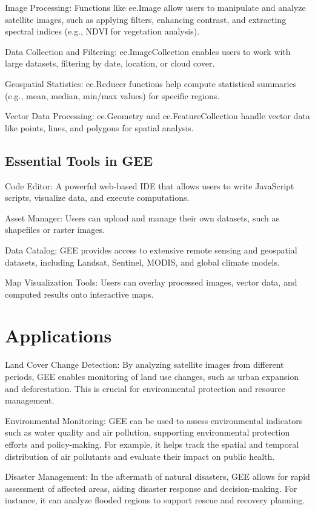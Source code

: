 \documentclass[
  letterpaper,
]{scrbook}
\begin{document}
Image Processing: Functions like ee.Image allow users to manipulate and
analyze satellite images, such as applying filters, enhancing contrast,
and extracting spectral indices (e.g., NDVI for vegetation analysis).

Data Collection and Filtering: ee.ImageCollection enables users to work
with large datasets, filtering by date, location, or cloud cover.

Geospatial Statistics: ee.Reducer functions help compute statistical
summaries (e.g., mean, median, min/max values) for specific regions.

Vector Data Processing: ee.Geometry and ee.FeatureCollection handle
vector data like points, lines, and polygons for spatial analysis.

\subsection{Essential Tools in GEE}\label{essential-tools-in-gee}

Code Editor: A powerful web-based IDE that allows users to write
JavaScript scripts, visualize data, and execute computations.

Asset Manager: Users can upload and manage their own datasets, such as
shapefiles or raster images.

Data Catalog: GEE provides access to extensive remote sensing and
geospatial datasets, including Landsat, Sentinel, MODIS, and global
climate models.

Map Visualization Tools: Users can overlay processed images, vector
data, and computed results onto interactive maps.

\section{Applications}\label{applications-3}

Land Cover Change Detection: By analyzing satellite images from
different periods, GEE enables monitoring of land use changes, such as
urban expansion and deforestation. This is crucial for environmental
protection and resource management.

Environmental Monitoring: GEE can be used to assess environmental
indicators such as water quality and air pollution, supporting
environmental protection efforts and policy-making. For example, it
helps track the spatial and temporal distribution of air pollutants and
evaluate their impact on public health.

Disaster Management: In the aftermath of natural disasters, GEE allows
for rapid assessment of affected areas, aiding disaster response and
decision-making. For instance, it can analyze flooded regions to support
rescue and recovery planning.
\end{document}
